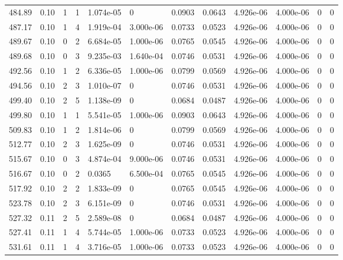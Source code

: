 \documentclass[preview]{standalone}
\begin{document}
{{{{{\begin{tabular}{L{1.2cm}C{1.2cm} C{0.3cm}C{0.5cm} C{1.4cm}C{1.4cm} C{1.4cm}C{1.4cm} C{1.6cm}C{1.6cm} C{1.6cm}C{1.6cm}}
  484.89  &  0.10  & 1     &  1 &  1.074e-05  & 0  &  0.0903&   0.0643& 4.926e-06 & 4.000e-06   &  0 & 0  \\ 
  487.17  &  0.10  & 1     &  4 &  1.919e-04  & 3.000e-06  &  0.0733&   0.0523& 4.926e-06 & 4.000e-06   &  0 & 0  \\ 
  489.67  &  0.10  & 0     &  2 &  6.684e-05  & 1.000e-06  &  0.0765&   0.0545& 4.926e-06 & 4.000e-06   &  0 & 0  \\ 
  489.68  &  0.10  & 0     &  3 &  9.235e-03  & 1.640e-04  &  0.0746&   0.0531& 4.926e-06 & 4.000e-06   &  0 & 0  \\ 
  492.56  &  0.10  & 1     &  2 &  6.336e-05  & 1.000e-06  &  0.0799&   0.0569& 4.926e-06 & 4.000e-06   &  0 & 0  \\ 
  494.56  &  0.10  & 2     &  3 &  1.010e-07  & 0  &  0.0746&   0.0531& 4.926e-06 & 4.000e-06   &  0 & 0  \\ 
  499.40  &  0.10  & 2     &  5 &  1.138e-09  & 0  &  0.0684&   0.0487& 4.926e-06 & 4.000e-06   &  0 & 0  \\ 
  499.80  &  0.10  & 1     &  1 &  5.541e-05  & 1.000e-06  &  0.0903&   0.0643& 4.926e-06 & 4.000e-06   &  0 & 0  \\ 
  509.83  &  0.10  & 1     &  2 &  1.814e-06  & 0  &  0.0799&   0.0569& 4.926e-06 & 4.000e-06   &  0 & 0  \\ 
  512.77  &  0.10  & 2     &  3 &  1.625e-09  & 0  &  0.0746&   0.0531& 4.926e-06 & 4.000e-06   &  0 & 0  \\ 
  515.67  &  0.10  & 0     &  3 &  4.874e-04  & 9.000e-06  &  0.0746&   0.0531& 4.926e-06 & 4.000e-06   &  0 & 0  \\ 
  516.67  &  0.10  & 0     &  2 &  0.0365  & 6.500e-04  &  0.0765&   0.0545& 4.926e-06 & 4.000e-06   &  0 & 0  \\ 
  517.92  &  0.10  & 2     &  2 &  1.833e-09  & 0  &  0.0765&   0.0545& 4.926e-06 & 4.000e-06   &  0 & 0  \\ 
  523.78  &  0.10  & 2     &  3 &  6.151e-09  & 0  &  0.0746&   0.0531& 4.926e-06 & 4.000e-06   &  0 & 0  \\ 
  527.32  &  0.11  & 2     &  5 &  2.589e-08  & 0  &  0.0684&   0.0487& 4.926e-06 & 4.000e-06   &  0 & 0  \\ 
  527.41  &  0.11  & 1     &  4 &  5.744e-05  & 1.000e-06  &  0.0733&   0.0523& 4.926e-06 & 4.000e-06   &  0 & 0  \\ 
  531.61  &  0.11  & 1     &  4 &  3.716e-05  & 1.000e-06  &  0.0733&   0.0523& 4.926e-06 & 4.000e-06   &  0 & 0  \\ 

\end{tabular}}}}}}
\end{document}

